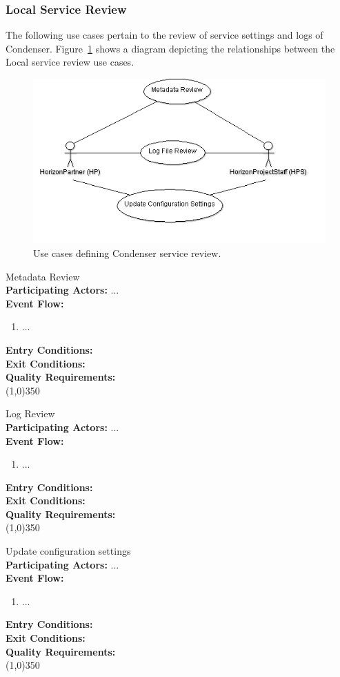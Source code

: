 \subsubsection{Local Service Review}	
The following use cases pertain to the review of service settings and logs of Condenser. Figure~\ref{LocalServiceReviewUse} shows a diagram depicting the relationships between the Local service review use cases.
\begin{center}
	\begin{figure}[htbp]
		\includegraphics[scale=.5]{images/LocalServiceReviewUse.png}
		\caption{Use cases defining Condenser service review.\label{LocalServiceReviewUse}}
	\end{figure}
\end{center}	
	 
	Metadata Review \\	 
	\textbf{Participating Actors:}  ... \\
	\textbf{Event Flow:}
	\begin{enumerate}
\item  ...
    \end{enumerate}
	\textbf{Entry Conditions:}\\
	\textbf{Exit Conditions:}\\
	\textbf{Quality Requirements:}\\
	\line(1,0){350}		
			 
	Log Review \\	 
	\textbf{Participating Actors:}  ... \\
	\textbf{Event Flow:}
	\begin{enumerate}
\item  ...
    \end{enumerate}
	\textbf{Entry Conditions:}\\
	\textbf{Exit Conditions:}\\
	\textbf{Quality Requirements:}\\
	\line(1,0){350}			
			 
	Update configuration settings \\	 
	\textbf{Participating Actors:}  ... \\
	\textbf{Event Flow:}
	\begin{enumerate}
\item  ...
    \end{enumerate}
	\textbf{Entry Conditions:}\\
	\textbf{Exit Conditions:}\\
	\textbf{Quality Requirements:}\\
	\line(1,0){350}		